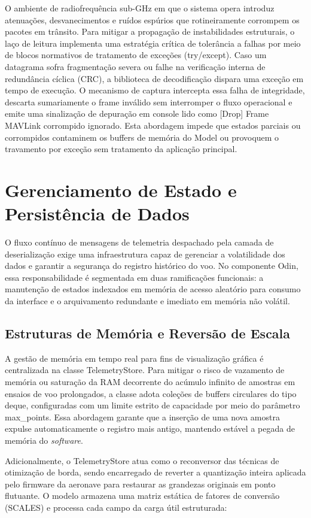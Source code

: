 O ambiente de radiofrequência sub-GHz em que o sistema opera introduz atenuações, desvanecimentos e ruídos espúrios que rotineiramente corrompem os pacotes em trânsito. Para mitigar a propagação de instabilidades estruturais, o laço de leitura implementa uma estratégia crítica de tolerância a falhas por meio de blocos normativos de tratamento de exceções (try/except). Caso um datagrama sofra fragmentação severa ou falhe na verificação interna de redundância cíclica (CRC), a biblioteca de decodificação dispara uma exceção em tempo de execução. O mecanismo de captura intercepta essa falha de integridade, descarta sumariamente o frame inválido sem interromper o fluxo operacional e emite uma sinalização de depuração em console lido como [Drop] Frame MAVLink corrompido ignorado. Esta abordagem impede que estados parciais ou corrompidos contaminem os buffers de memória do Model ou provoquem o travamento por exceção sem tratamento da aplicação principal.

\section{Gerenciamento de Estado e Persistência de Dados}
O fluxo contínuo de mensagens de telemetria despachado pela camada de deserialização exige uma infraestrutura capaz de gerenciar a volatilidade dos dados e garantir a segurança do registro histórico do voo. No componente Odin, essa responsabilidade é segmentada em duas ramificações funcionais: a manutenção de estados indexados em memória de acesso aleatório para consumo da interface e o arquivamento redundante e imediato em memória não volátil.

\subsection{Estruturas de Memória e Reversão de Escala}

A gestão de memória em tempo real para fins de visualização gráfica é centralizada na classe TelemetryStore. Para mitigar o risco de vazamento de memória ou saturação da RAM decorrente do acúmulo infinito de amostras em ensaios de voo prolongados, a classe adota coleções de buffers circulares do tipo deque, configuradas com um limite estrito de capacidade por meio do parâmetro max\_points. Essa abordagem garante que a inserção de uma nova amostra expulse automaticamente o registro mais antigo, mantendo estável a pegada de memória do \textit{software}.

Adicionalmente, o TelemetryStore atua como o reconversor das técnicas de otimização de borda, sendo encarregado de reverter a quantização inteira aplicada pelo firmware da aeronave para restaurar as grandezas originais em ponto flutuante. O modelo armazena uma matriz estática de fatores de conversão (SCALES) e processa cada campo da carga útil estruturada:

